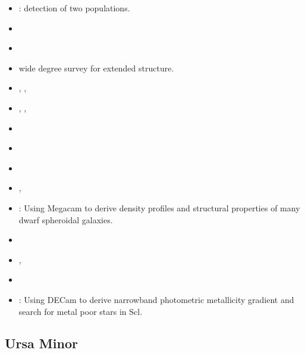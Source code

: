\begin{itemize}
\tightlist
\item
  \citet{tolstoy+2004}: detection of two populations.
\item
  \citet{battaglia+2008a}
\item
  \citet{sestito+2023a}
\item
  \citet{westfall+2006} wide degree survey for extended structure.
\item
  \citet{tolstoy+2023}, \citet{arroyo-polonio+2023},
  \citet{arroyo-polonio+2024}
\item
  \citet{eskridge1988}, \citet{eskridge1988a}, \citet{eskridge1988b}
\item
  \citet{coleman+dacosta+bland-hawthorn2005}
\item
  \citet{DQ1994}
\item
  \citet{WMO2009}
\item
  \citet{IH1995},
\item
  \citet{munoz+2018}: Using Megacam to derive density profiles and
  structural properties of many dwarf spheroidal galaxies.
\item
  \citet{kirby+2009}
\item
  \citet{martinez-vazquez+2015}, \citet{pietrzynski+2008}
\item
  \citet{grebel1996}
\item
  \citet{barbosa+2025}: Using DECam to derive narrowband photometric
  metallicity gradient and search for metal poor stars in Scl.
\end{itemize}

\subsection{Ursa Minor}\label{ursa-minor}

